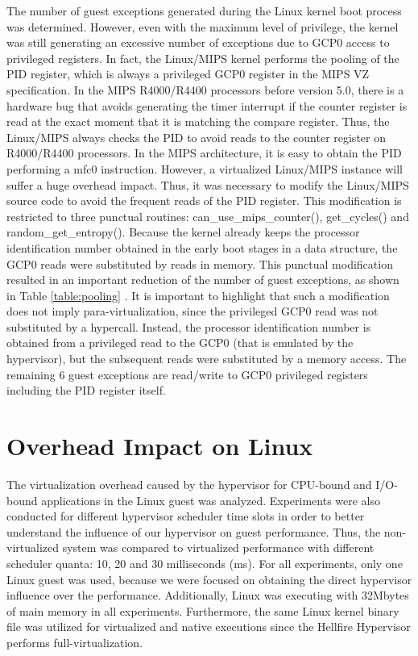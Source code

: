 The number of guest exceptions generated during the Linux kernel boot process was determined. However, even with the maximum level of privilege, the kernel was still generating an excessive number of exceptions due to GCP0 access to privileged registers. In fact, the Linux/MIPS kernel performs the pooling of the PID register, which is always a privileged GCP0 register in the MIPS VZ specification. In the MIPS R4000/R4400 processors \cite{mipsr40001994} before version 5.0, there is a hardware bug that avoids generating the timer interrupt if the counter register is read at the exact moment that it is matching the compare register. Thus, the Linux/MIPS always checks the PID to avoid reads to the counter register on R4000/R4400 processors. In the MIPS architecture, it is easy to obtain the PID performing a mfc0 instruction. However, a virtualized Linux/MIPS instance will suffer a huge overhead impact. Thus, it was necessary to modify the Linux/MIPS source code to avoid the frequent reads of the PID register. This modification is restricted to three punctual routines: can\_use\_mips\_counter(), get\_cycles() and random\_get\_entropy(). Because the kernel already keeps the processor identification number obtained in the early boot stages in a data structure, the GCP0 reads were substituted by reads in memory. This punctual modification resulted in  an important reduction of the number of guest exceptions, as shown in Table \ref{table:pooling} . It is important to highlight that such a modification does not imply para-virtualization, since the privileged GCP0 read was not substituted by a hypercall. Instead, the processor identification number is obtained from a privileged read to the GCP0 (that is emulated by the hypervisor), but the subsequent reads were substituted by a memory access. The remaining 6 guest exceptions are read/write to GCP0 privileged registers including the PID register itself. 


\section{Overhead Impact on Linux}
\label{section6:overhead}

The virtualization overhead caused by the hypervisor for CPU-bound and I/O-bound applications in the Linux guest was analyzed. Experiments were also conducted for different hypervisor scheduler time slots in order to  better understand the influence of our hypervisor on guest performance. Thus, the non-virtualized system was compared to virtualized performance with different scheduler quanta: 10, 20 and 30 milliseconds (ms). For all experiments, only one Linux guest was used, because we were focused on obtaining the direct hypervisor influence over the performance. Additionally,  Linux was executing with 32Mbytes of main memory in all experiments. Furthermore, the same Linux kernel binary file was utilized for virtualized and native executions since the Hellfire Hypervisor performs full-virtualization. 


